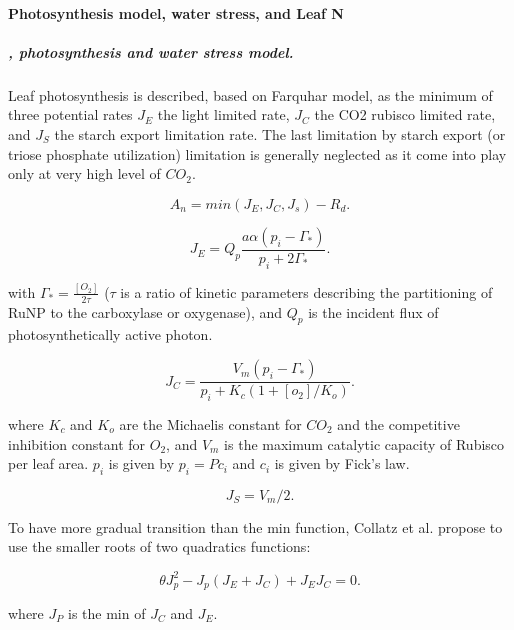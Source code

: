 \documentclass[a4paper,11pt]{article}
\begin{document}
\paragraph{Photosynthesis model, water stress, and Leaf N}

\subparagraph{\citet{Collatz-1991}, photosynthesis and water stress model.}


Leaf photosynthesis is described, based on Farquhar model, as the minimum of three potential rates $J_E$ the light limited rate, $J_C$ the CO2 rubisco limited rate, and $J_S$ the starch export limitation rate. The last limitation by starch export (or triose phosphate utilization) limitation is generally neglected as it come into play only at very high level of $CO_2$.

\begin{equation}
\label{eq:An}
A_n= min(J_E, J_C, J_s) - R_d.
\end{equation}


\begin{equation}
\label{eq:JC}
J_E = Q_p \frac{a \alpha (p_i - \Gamma_*)}{p_i + 2 \Gamma_*}.
\end{equation}

with $\Gamma_* = \frac{[O_2]}{2\tau}$ ($\tau$ is a ratio of kinetic parameters describing the partitioning of RuNP to the carboxylase or oxygenase), and $Q_p$ is the incident flux of photosynthetically active photon.

\begin{equation}
\label{eq:JE}
J_C= \frac{V_m (p_i - \Gamma_*)}{p_i + K_c (1+[o_2]/K_o)}.
\end{equation}

where $K_c$ and $K_o$ are the Michaelis constant for $CO_2$ and the competitive inhibition constant for $O_2$, and $V_m$ is the maximum catalytic capacity of Rubisco per leaf area.
$p_i$ is given by $p_i = P c_i$ and $c_i$ is given by Fick's law.

\begin{equation}
\label{eq:JS}
J_S= V_m/2.
\end{equation}

To have more gradual transition than the min function, Collatz et al. propose to use the smaller roots of two quadratics functions:

\begin{equation}
\label{eq:Q1}
\theta J_p^2 - J_p(J_E+J_C) + J_E J_C= 0.
\end{equation}

where $J_P$ is the min of $J_C$ and $J_E$.
\end{document}
